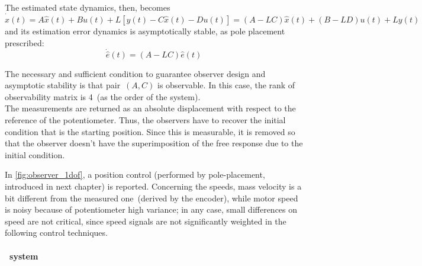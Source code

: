 The estimated state dynamics, then, becomes
\begin{equation}
	\dot{\hat{x}}(t) = A\hat{x}(t) + Bu(t) + L [y(t) - C\hat{x}(t) - Du(t)] = (A-LC)\hat{x}(t) + (B-LD)u(t) + Ly(t)
	\label{eqn:est_state_dyn}
\end{equation}
and its estimation error dynamics is asymptotically stable, as pole placement prescribed:
\begin{equation}
	\dot{\hat{e}} (t) = (A-LC) \hat{e} (t)
\end{equation}

The necessary and sufficient condition to guarantee observer design and asymptotic stability is that pair~$(A,C)$ is observable. In this case, the rank of observability matrix is 4~(as the order of the system). \\

The measurements are returned as an absolute displacement with respect to the reference of the potentiometer. Thus, the observers have to recover the initial condition that is the starting position. Since this is measurable, it is removed so that the observer doesn't have the superimposition of the free response due to the initial condition. 

In \cref{fig:observer_1dof}, a position control (performed by pole-placement, introduced in next chapter) is reported. 
Concerning the speeds, mass velocity is a bit different from the measured one~(derived by the encoder), while motor speed is noisy because of potentiometer high variance; in any case, small differences on speed are not critical, since speed signals are not significantly weighted in the following control techniques.

\paragraph{\twodof\ system}

